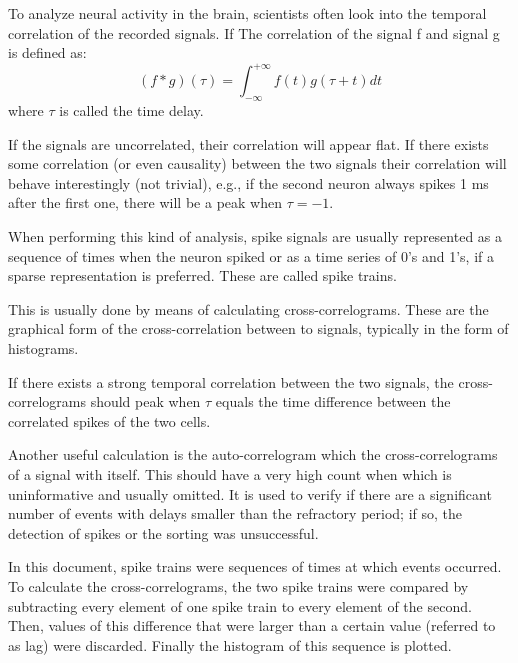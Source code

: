 To analyze neural activity in the brain, scientists often look into the temporal correlation of the recorded signals. If The correlation of the signal f and signal g is defined as:
\begin{equation}
\left( f * g \right) \left( \tau \right) = \int_{- \infty }^{ + \infty } f \left( t \right) g \left( \tau + t \right) dt
\label{eq:CCdefinition}
\end{equation}
where $\tau$ is called the time delay.

If the signals are uncorrelated, their correlation will appear flat. If there exists some correlation (or even causality) between the two signals their correlation will behave interestingly (not trivial), e.g., if the second neuron always spikes 1 ms after the first one, there will be a peak when $\tau = -1$.

When performing this kind of analysis, spike signals are usually represented as a sequence of times when the neuron spiked or as a time series of 0's and 1's, if a sparse representation is preferred. These are called spike trains.

This is usually done by means of calculating cross-correlograms. These are the graphical form of the cross-correlation between to signals, typically in the form of histograms.

If there exists a strong temporal correlation between the two signals, the cross-correlograms should peak when $\tau$   equals the time difference between the correlated spikes of the two cells. 

Another useful calculation is the auto-correlogram which the cross-correlograms of a signal with itself. This should have a very high count when  which is uninformative and usually omitted. It is used to verify if there are a significant number of events with delays smaller than the refractory period; if so, the detection of spikes or the sorting was unsuccessful.

In this document, spike trains were sequences of times at which events occurred. To calculate the cross-correlograms, the two spike trains were compared by subtracting every element of one spike train to every element of the second. Then, values of this difference that were larger than a certain value (referred to as lag) were discarded. Finally the histogram of this sequence is plotted.

